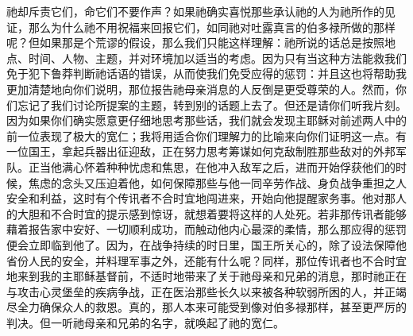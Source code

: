 祂却斥责它们，命它们不要作声？如果祂确实喜悦那些承认祂的人为祂所作的见证，那么为什么祂不用祝福来回报它们，如同祂对吐露真言的伯多禄所做的那样呢？但如果那是个荒谬的假设，那么我们只能这样理解：祂所说的话总是按照地点、时间、人物、主题，并对环境加以适当的考虑。因为只有当这种方法能救我们免于犯下鲁莽判断祂话语的错误，从而使我们免受应得的惩罚：并且这也将帮助我更加清楚地向你们说明，那位报告祂母亲消息的人反倒是更受尊荣的人。然而，你们忘记了我们讨论所提案的主题，转到别的话题上去了。但还是请你们听我片刻。因为如果你们确实愿意更仔细地思考那些话，我们就会发现主耶稣对前述两人中的前一位表现了极大的宽仁；我将用适合你们理解力的比喻来向你们证明这一点。有一位国王，拿起兵器出征迎敌，正在努力思考筹谋如何克敌制胜那些敌对的外邦军队。正当他满心怀着种种忧虑和焦思，在他冲入敌军之后，进而开始俘获他们的时候，焦虑的念头又压迫着他，如何保障那些与他一同辛劳作战、身负战争重担之人安全和利益，这时有个传讯者不合时宜地闯进来，开始向他提醒家务事。他对那人的大胆和不合时宜的提示感到惊讶，就想着要将这样的人处死。若非那传讯者能够藉着报告家中安好、一切顺利成功，而触动他内心最深的柔情，那么那应得的惩罚便会立即临到他了。因为，在战争持续的时日里，国王所关心的，除了设法保障他省份人民的安全，并料理军事之外，还能有什么呢？同样，那位传讯者也不合时宜地来到我的主耶稣基督前，不适时地带来了关于祂母亲和兄弟的消息，那时祂正在与攻击心灵堡垒的疾病争战，正在医治那些长久以来被各种软弱所困的人，并正竭尽全力确保众人的救恩。真的，那人本来可能受到像对伯多禄那样，甚至更严厉的判决。但一听祂母亲和兄弟的名字，就唤起了祂的宽仁。\par

